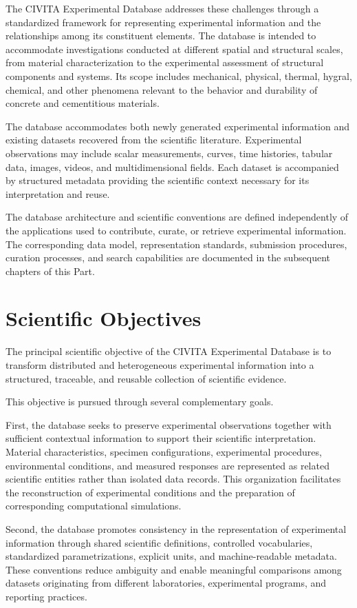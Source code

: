 The CIVITA Experimental Database addresses these challenges through
a standardized framework for representing experimental information
and the relationships among its constituent elements. The database
is intended to accommodate investigations conducted at different
spatial and structural scales, from material characterization
to the experimental assessment of structural components and
systems. Its scope includes mechanical, physical, thermal,
hygral, chemical, and other phenomena relevant to the behavior
and durability of concrete and cementitious materials.

The database accommodates both newly generated experimental
information and existing datasets recovered from the scientific
literature. Experimental observations may include scalar
measurements, curves, time histories, tabular data, images,
videos, and multidimensional fields. Each dataset is accompanied
by structured metadata providing the scientific context
necessary for its interpretation and reuse.

The database architecture and scientific conventions are
defined independently of the applications used to contribute,
curate, or retrieve experimental information. The corresponding
data model, representation standards, submission procedures,
curation processes, and search capabilities are documented
in the subsequent chapters of this Part.


\section{Scientific Objectives}

The principal scientific objective of the CIVITA Experimental
Database is to transform distributed and heterogeneous experimental
information into a structured, traceable, and reusable collection
of scientific evidence.

This objective is pursued through several complementary goals.

First, the database seeks to preserve experimental observations
together with sufficient contextual information to support
their scientific interpretation. Material characteristics,
specimen configurations, experimental procedures, environmental
conditions, and measured responses are represented as related
scientific entities rather than isolated data records. This
organization facilitates the reconstruction of experimental
conditions and the preparation of corresponding computational
simulations.

Second, the database promotes consistency in the representation
of experimental information through shared scientific definitions,
controlled vocabularies, standardized parametrizations, explicit
units, and machine-readable metadata. These conventions reduce
ambiguity and enable meaningful comparisons among datasets
originating from different laboratories, experimental programs,
and reporting practices.

